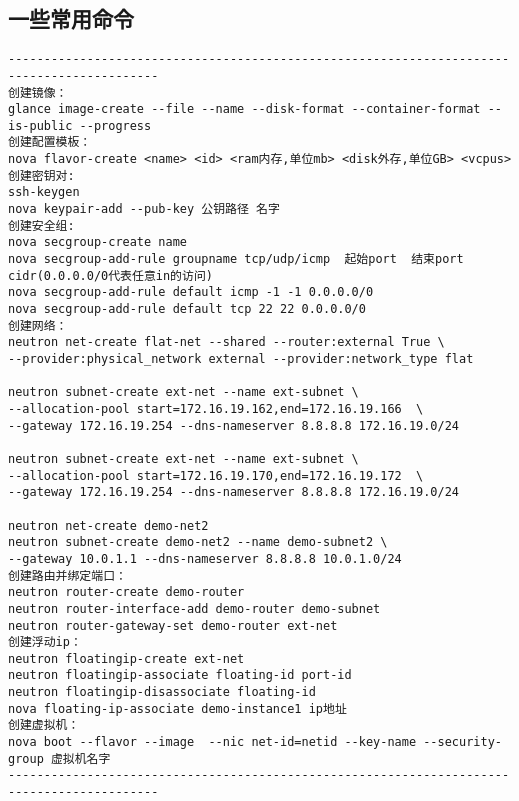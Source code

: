 \documentclass[a4paper,left=1.5cm,right=1.5cm,11pt]{article}
\begin{document}
\subsection{一些常用命令}
\begin{lstlisting}
-------------------------------------------------------------------------------------------
创建镜像：
glance image-create --file --name --disk-format --container-format --is-public --progress
创建配置模板：
nova flavor-create <name> <id> <ram内存,单位mb> <disk外存,单位GB> <vcpus>
创建密钥对:
ssh-keygen
nova keypair-add --pub-key 公钥路径 名字
创建安全组:
nova secgroup-create name
nova secgroup-add-rule groupname tcp/udp/icmp  起始port  结束port  cidr(0.0.0.0/0代表任意in的访问) 
nova secgroup-add-rule default icmp -1 -1 0.0.0.0/0
nova secgroup-add-rule default tcp 22 22 0.0.0.0/0
创建网络：
neutron net-create flat-net --shared --router:external True \
--provider:physical_network external --provider:network_type flat

neutron subnet-create ext-net --name ext-subnet \
--allocation-pool start=172.16.19.162,end=172.16.19.166  \
--gateway 172.16.19.254 --dns-nameserver 8.8.8.8 172.16.19.0/24

neutron subnet-create ext-net --name ext-subnet \
--allocation-pool start=172.16.19.170,end=172.16.19.172  \
--gateway 172.16.19.254 --dns-nameserver 8.8.8.8 172.16.19.0/24

neutron net-create demo-net2
neutron subnet-create demo-net2 --name demo-subnet2 \
--gateway 10.0.1.1 --dns-nameserver 8.8.8.8 10.0.1.0/24
创建路由并绑定端口：
neutron router-create demo-router
neutron router-interface-add demo-router demo-subnet
neutron router-gateway-set demo-router ext-net
创建浮动ip：
neutron floatingip-create ext-net
neutron floatingip-associate floating-id port-id
neutron floatingip-disassociate floating-id
nova floating-ip-associate demo-instance1 ip地址
创建虚拟机：
nova boot --flavor --image  --nic net-id=netid --key-name --security-group 虚拟机名字
-------------------------------------------------------------------------------------------
\end{lstlisting}
\end{document}

